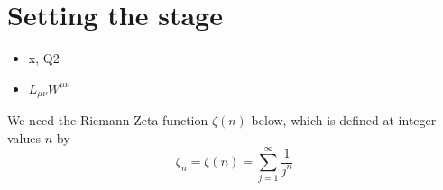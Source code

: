 \section{Setting the stage}
\label{sec:xs}
\begin{itemize}
    \item x, Q2
    \item $L_{\mu\nu}W^{\mu\nu}$
\end{itemize}

We need the Riemann Zeta function $\zeta(n)$ below, which is defined at integer values $n$ by
\begin{equation}
    \zeta_n = \zeta(n) = \sum\limits_{j=1}^\infty \frac 1 {j^n}
\end{equation}
